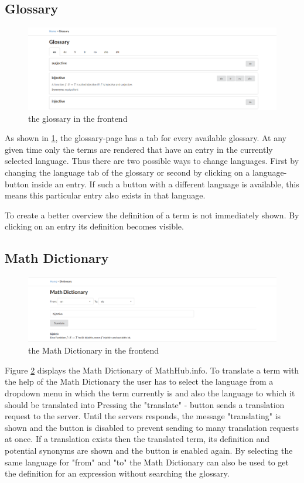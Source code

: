\documentclass[11pt,a4paper]{article}
\begin{document}
\subsection{Glossary} \label{gloss}
\begin{figure}[H]
\includegraphics[width=1\textwidth]{glossary.png}
\caption{the glossary in the frontend}
\label{fig:glossary}
\end{figure}
As shown in \ref{fig:glossary}, the glossary-page has a tab for every available glossary.
At any given time only the terms are rendered that have an entry in the currently selected language.
Thus there are two possible ways to change languages.
First by changing the language tab of the glossary or second by clicking on a language-button inside an entry.
If such a button with a different language is available, this means this particular entry also exists in that language.

To create a better overview the definition of a term is not immediately shown.
By clicking on an entry its definition becomes visible.

\subsection{Math Dictionary}
\begin{figure}[H]
\includegraphics[width=1\textwidth]{dictionary.png}
\caption{the Math Dictionary in the frontend}
\label{fig:dict}
\end{figure}
Figure \ref{fig:dict} displays the Math Dictionary of MathHub.info.
To translate a term with the help of the Math Dictionary the user has to select the language from a dropdown menu in which the term currently is and also the language to which it should be translated into
Pressing the "translate" - button sends a translation request to the server.
Until the servers responds, the message "translating" is shown and the button is disabled to prevent sending to many translation requests at once.
If a translation exists then the translated term, its definition and potential synonyms are shown and the button is enabled again.
By selecting the same language for "from" and "to" the Math Dictionary can also be used to get the definition for an expression without searching the glossary.
\end{document}
